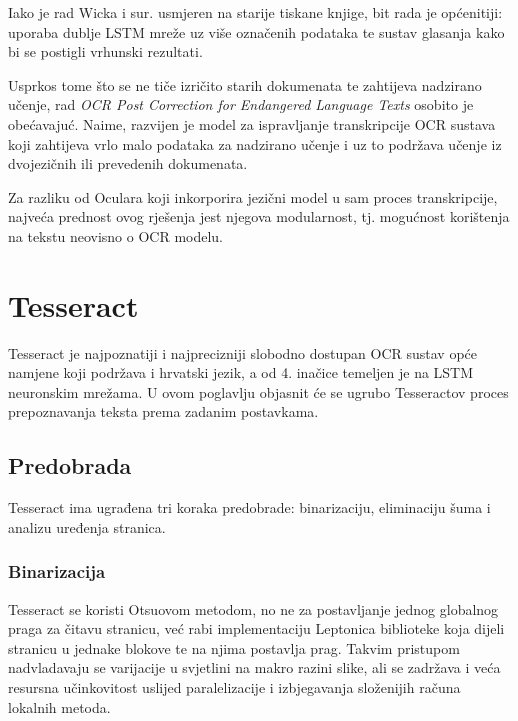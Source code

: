 \documentclass[zavrsnirad]{fer}
\begin{document}
Iako je rad Wicka i sur. \cite{Wick2018} usmjeren na starije tiskane knjige, bit rada je općenitiji: uporaba dublje LSTM mreže uz više označenih podataka te sustav glasanja kako bi se postigli vrhunski rezultati.

Usprkos tome što se ne tiče izričito starih dokumenata te zahtijeva nadzirano učenje, rad \textit{OCR Post Correction for Endangered Language Texts} \cite{Rijhwani2022} osobito je obećavajuć. Naime, razvijen je model za ispravljanje transkripcije OCR sustava koji zahtijeva vrlo malo podataka za nadzirano učenje i uz to podržava učenje iz dvojezičnih ili prevedenih dokumenata. 

Za razliku od Oculara koji inkorporira jezični model u sam proces transkripcije, najveća prednost ovog rješenja jest njegova modularnost, tj. mogućnost korištenja na tekstu neovisno o OCR modelu.



\chapter{Tesseract}
\label{pog:tesseract}

Tesseract \cite{Smith2007} je najpoznatiji i najprecizniji slobodno dostupan OCR sustav opće namjene koji podržava i hrvatski jezik, a od 4. inačice temeljen je na LSTM neuronskim mrežama. U ovom poglavlju objasnit će se ugrubo Tesseractov proces prepoznavanja teksta prema zadanim postavkama.

\section{Predobrada}

Tesseract ima ugrađena tri koraka predobrade: binarizaciju, eliminaciju šuma i analizu uređenja stranica.

\subsection{Binarizacija}

Tesseract se koristi Otsuovom metodom, no ne za postavljanje jednog globalnog praga za čitavu stranicu, već rabi implementaciju Leptonica biblioteke \cite{Leptonica} koja dijeli stranicu u jednake blokove te na njima postavlja prag. Takvim pristupom nadvladavaju se varijacije u svjetlini na makro razini slike, ali se zadržava i veća resursna učinkovitost uslijed paralelizacije i izbjegavanja složenijih računa lokalnih metoda.
\end{document}
